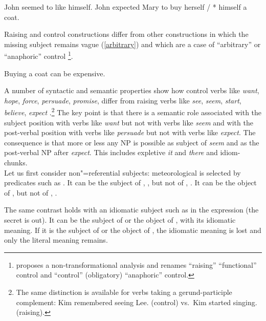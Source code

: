 \documentclass[output=paper
	        ,collection
	        ,collectionchapter
 	        ,biblatex
                ,babelshorthands
                ,newtxmath
                ,draftmode
                ,colorlinks, citecolor=brown
]{langscibook}
\begin{document}
\begin{exe}
	\ex \begin{xlist}
	\ex John seemed to like himself.\label{seem}
\ex  John expected Mary to buy herself / * himself a coat. \label{exp}
\end{xlist}
 \end{exe}
 
 Raising and control constructions differ from other constructions in which the missing subject
 remains vague (\ref{arbitrary}) and which are a case of ``arbitrary'' or ``anaphoric'' control
 \parencites[--76]{Chomsky1981}[]{Bresnan1982}\footnote{\citet{Bresnan1982} proposes a non-transformational analysis and renames ``raising'' ``functional'' control and ``control'' (obligatory) ``anaphoric'' control.}.
 
\ea
Buying a coat can be expensive.\label{arbitrary}
\z
  
 A number of syntactic and semantic properties show how control verbs like \emph{want}, \emph{hope}, \emph{force}, \emph{persuade}, \emph{promise}, differ from raising verbs like \emph{see}, \emph{seem}, \emph{start}, \emph{believe}, \emph{expect} \citep{Rosenbaum67a-u,Postal1974,Bresnan1982}.\footnote{The same distinction is available for verbs taking a gerund-participle complement:
Kim remembered seeing Lee. (control) vs.\  Kim started singing. (raising).}
 The key point is that there is a semantic role associated with the subject position with verbs like \emph{want} but not with verbs like \emph{seem} and with the post-verbal position with verbs like \emph{persuade} but not with verbs like \emph{expect}.  The consequence is that more or less any NP is possible as subject of \emph{seem} and as the post-verbal NP after \emph{expect}. This includes expletive \emph{it} and \emph{there} and idiom-chunks. \\
     Let us first consider non"=referential subjects: meteorological  is selected
 by predicates such as . It can be the subject of , , but not of
 , . It can be the object of ,  but not of , .
	
\eal
{}
 \label{rain1}
 \label{rain2}
\zl
\eal
{} \label{rain3}
 \label{rain4}
\zl
 	
 The same contrast holds with an idiomatic subject such as  in the expression  (the secret is out). It can be the subject of  or the object of , with its idiomatic meaning. If it is the subject of  or the object of , the idiomatic meaning is lost and only the literal meaning remains.
 
\end{document}

